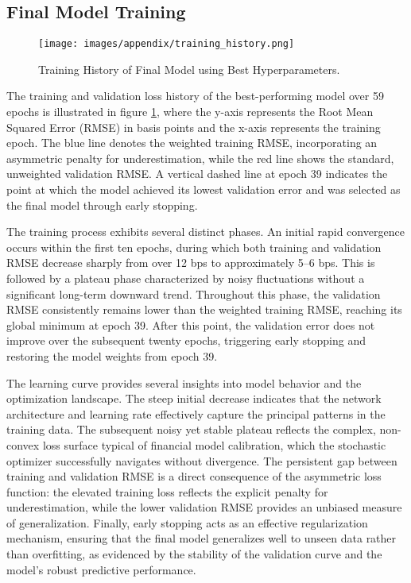 \subsection{Final Model Training}
\begin{figure}[H]
	\centering
	\texttt{[image: images/appendix/training\_history.png]}
	\caption{Training History of Final Model using Best Hyperparameters.}
	\label{fig:training_history}
\end{figure}
The training and validation loss history of the best-performing model over 59 epochs is illustrated in figure \ref{fig:training_history}, where the y-axis represents the Root Mean Squared Error (RMSE) in basis points and the x-axis represents the training epoch. The blue line denotes the weighted training RMSE, incorporating an asymmetric penalty for underestimation, while the red line shows the standard, unweighted validation RMSE. A vertical dashed line at epoch 39 indicates the point at which the model achieved its lowest validation error and was selected as the final model through early stopping.

The training process exhibits several distinct phases. An initial rapid convergence occurs within the first ten epochs, during which both training and validation RMSE decrease sharply from over 12 bps to approximately 5--6 bps. This is followed by a plateau phase characterized by noisy fluctuations without a significant long-term downward trend. Throughout this phase, the validation RMSE consistently remains lower than the weighted training RMSE, reaching its global minimum at epoch 39. After this point, the validation error does not improve over the subsequent twenty epochs, triggering early stopping and restoring the model weights from epoch 39.

The learning curve provides several insights into model behavior and the optimization landscape. The steep initial decrease indicates that the network architecture and learning rate effectively capture the principal patterns in the training data. The subsequent noisy yet stable plateau reflects the complex, non-convex loss surface typical of financial model calibration, which the stochastic optimizer successfully navigates without divergence. The persistent gap between training and validation RMSE is a direct consequence of the asymmetric loss function: the elevated training loss reflects the explicit penalty for underestimation, while the lower validation RMSE provides an unbiased measure of generalization. Finally, early stopping acts as an effective regularization mechanism, ensuring that the final model generalizes well to unseen data rather than overfitting, as evidenced by the stability of the validation curve and the model's robust predictive performance.

